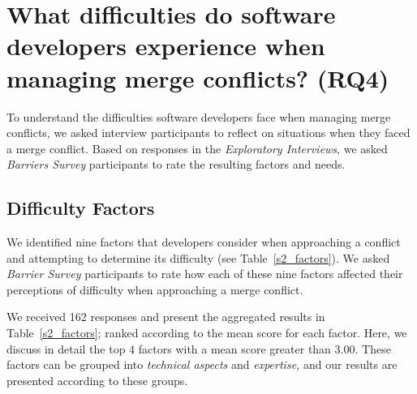 
\vspace*{1.8\baselineskip}
\section{What difficulties do software developers experience when managing merge conflicts? (RQ4)}\label{RQ4}

To understand the difficulties software developers face when managing merge conflicts, we asked interview participants to reflect on situations when they faced a merge conflict.
Based on responses in the \textit{Exploratory Interviews}, we asked \textit{Barriers Survey} participants to rate the resulting factors and needs.

\subsection{Difficulty Factors}\label{difficulty-factors}

We identified nine factors that developers consider when approaching a conflict and attempting to determine its difficulty (see Table~\ref{s2_factors}).
We asked \textit{Barrier Survey} participants to rate how each of these nine factors affected their perceptions of difficulty when approaching a merge conflict.

We received 162 responses and present the aggregated results in Table~\ref{s2_factors}; ranked according to the mean score for each factor.
Here, we discuss in detail the top 4 factors with a mean score greater than $3.00$.
These factors can be grouped into \textit{technical aspects} and \textit{expertise,} and our results are presented according to these groups.

